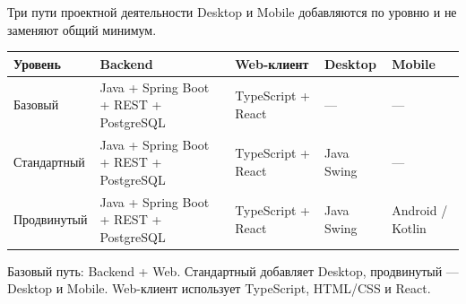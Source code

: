 \begin{frame}{Три пути проектной деятельности}
   Desktop и Mobile
  добавляются по уровню и не заменяют общий минимум.

  \medskip
  \footnotesize
  \setlength{\tabcolsep}{3pt}
  \begin{tabular}{@{}
    >{\raggedright\arraybackslash}p{}
    >{\raggedright\arraybackslash}p{}
    >{\raggedright\arraybackslash}p{}
    >{\raggedright\arraybackslash}p{}
    >{\raggedright\arraybackslash}p{}
    @{}}
    \toprule
    \textbf{Уровень} & \textbf{Backend} & \textbf{Web-клиент} & \textbf{Desktop} & \textbf{Mobile}\\
    \midrule
    Базовый
      & Java + Spring Boot + REST + PostgreSQL
      & TypeScript + React
      & ---
      & --- \\
    \addlinespace[0.38em]
    Стандартный
      & Java + Spring Boot + REST + PostgreSQL
      & TypeScript + React
      & Java Swing
      & --- \\
    \addlinespace[0.38em]
    Продвинутый
      & Java + Spring Boot + REST + PostgreSQL
      & TypeScript + React
      & Java Swing
      & Android / Kotlin \\
    \bottomrule
  \end{tabular}

  \vspace{0.55em}
  {\footnotesize\color{acGray}
  Базовый путь: Backend + Web. Стандартный добавляет Desktop,
  продвинутый --- Desktop и Mobile. Web-клиент использует TypeScript,
  HTML/CSS и React.}
\end{frame}
